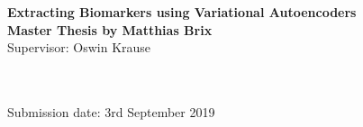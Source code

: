 \documentclass[a4paper]{report}
\renewcommand{\tableautorefname}{table}
\renewcommand{\figureautorefname}{figure}
\begin{document}
\def\sectionautorefname{section}
\def\tableautorefname{table}
\def\chapterautorefname{chapter}
\def\figureautorefname{figure}
\def\equationautorefname{equation}
\lstset{
  basicstyle=\ttfamily,
  mathescape
}


\begin{flushleft}
\thispagestyle{empty}
\setlength{\leftskip}{-0.8cm} 
\textbf{ } \\
\textbf{ } \\
\vspace{30mm}
\textbf{\huge Extracting Biomarkers using Variational Autoencoders} \\
\vspace{5mm}
\textbf{\large Master Thesis by Matthias Brix} \\
\vspace{5mm}
{\large Supervisor: Oswin Krause} \\
\vspace{5mm}
\setlength{\leftskip}{-1.0cm} 
\begin{tabular}{l l l}
\end{tabular} \\
\vspace{20mm}
\setlength{\leftskip}{-0.78cm} 
\vspace{13cm}\setlength{\leftskip}{-0.78cm} 
Submission date: 3rd September 2019 \\
\setlength{\leftskip}{0pt}
\end{flushleft}
\clearpage
\ClearWallPaper

\clearpage
\end{document}
